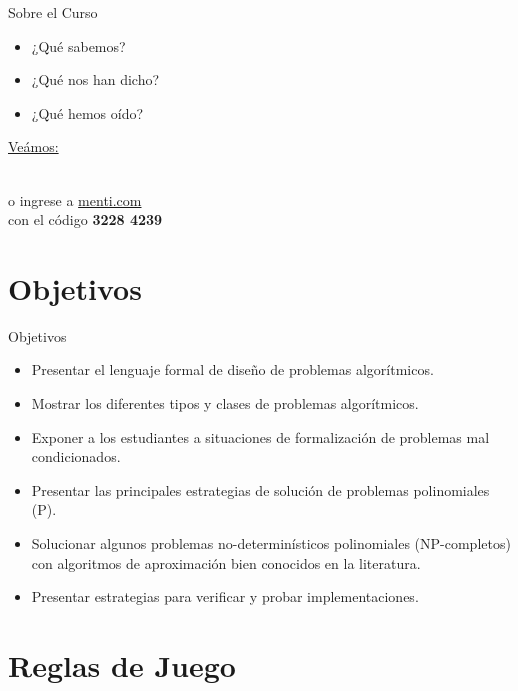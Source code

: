 \documentclass{beamer}
\begin{document}
\begin{frame}{Sobre el Curso}
\begin{itemize}
    \item ¿Qué sabemos?
    \item ¿Qué nos han dicho?
    \item ¿Qué hemos oído?
\end{itemize}

    \centering
    \vspace{10mm}
    {\small \href{https://www.mentimeter.com/app/presentation/alwg84st66fh5c49yxg9r7k3i5jqhuwn/edit?question=uah1wimn5n7w}{Veámos:}}\\
    \vspace{2mm}
  
    \\
    \vspace{2mm}
    \footnotesize  o ingrese a \href{https://www.menti.com/}{menti.com}\\ con el código \textbf{3228 4239}
\end{frame}

\section{Objetivos}

\begin{frame}{Objetivos}
\begin{itemize}
    \item Presentar el lenguaje formal de diseño de problemas algorítmicos.
    \item Mostrar los diferentes tipos y clases de problemas algorítmicos.
    \item Exponer a los estudiantes a situaciones de formalización de problemas mal condicionados.
    \item Presentar las principales estrategias de solución de problemas polinomiales (P).
    \item Solucionar algunos problemas no-determinísticos polinomiales (NP-completos) con algoritmos de aproximación bien conocidos en la literatura.
    \item Presentar estrategias para verificar y probar implementaciones.
\end{itemize}
\end{frame}

\section{Reglas de Juego}
\end{document}
